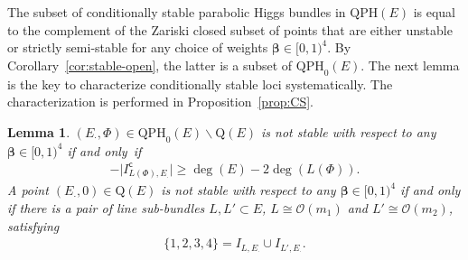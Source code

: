 \documentclass[10pt,a4paper]{amsart}
\newcommand{\calO}{\mathcal{O}}
\newcommand{\qp}{\boldsymbol{\cdot}}
\numberwithin{equation}{section}
\newtheorem{Lemma}[Theorem]{Lemma}
\begin{document}
The subset of conditionally stable parabolic Higgs bundles in $\mathrm{QPH}(E)$ is equal to the complement of the Zariski closed subset of points that are either unstable or strictly semi-stable for any choice of weights $\pmb{\beta}\in[0,1)^{4}$. By Corollary~\ref{cor:stable-open}, the latter is a subset of $\mathrm{QPH}_{0}(E)$. The next lemma is the key to characterize conditionally stable loci systematically. The characterization is performed in Proposition~\ref{prop:CS}.

\begin{Lemma}\label{lemma:not-stable}
$(E_{\qp},\Phi)\in\mathrm{QPH}_{0}(E)\backslash\mathrm{Q}(E)$ is not stable with respect to any $\pmb{\beta}\in[0,1)^{4}$ if and only~if
\begin{gather}\label{eq:not-stable}
-\big\vert I_{L(\Phi),E_{\qp}}^{\mathsf{c}}\big\vert \geq \deg(E)-2\deg(L(\Phi)).
\end{gather}
A point $(E_{\qp},0)\in\mathrm{Q}(E)$ is not stable with respect to any $\pmb{\beta}\in[0,1)^{4}$ if and only if there is a pair of line sub-bundles $L,L'\subset E$, $L\cong\calO(m_{1})$ and $L'\cong\calO(m_{2})$, satisfying
\begin{gather}\label{eq:L-L'}
\{1,2,3,4\} = I_{L,E_{\qp}}\cup I_{L',E_{\qp}}.
\end{gather}
\end{Lemma}
\end{document}
